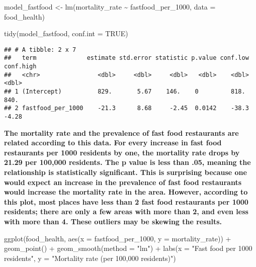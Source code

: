 \documentclass[
]{article}
\newenvironment{Shaded}{\begin{snugshade}}{\end{snugshade}}
\newcommand{\AttributeTok}[1]{\textcolor[rgb]{0.77,0.63,0.00}{#1}}
\newcommand{\ConstantTok}[1]{\textcolor[rgb]{0.00,0.00,0.00}{#1}}
\newcommand{\FunctionTok}[1]{\textcolor[rgb]{0.00,0.00,0.00}{#1}}
\newcommand{\NormalTok}[1]{#1}
\newcommand{\OtherTok}[1]{\textcolor[rgb]{0.56,0.35,0.01}{#1}}
\newcommand{\SpecialCharTok}[1]{\textcolor[rgb]{0.00,0.00,0.00}{#1}}
\newcommand{\StringTok}[1]{\textcolor[rgb]{0.31,0.60,0.02}{#1}}
\begin{document}
\begin{Shaded}
\begin{Highlighting}[]
\NormalTok{model\_fastfood }\OtherTok{\textless{}{-}} \FunctionTok{lm}\NormalTok{(mortality\_rate }\SpecialCharTok{\textasciitilde{}}\NormalTok{ fastfood\_per\_1000,}
                         \AttributeTok{data =}\NormalTok{ food\_health)}

\FunctionTok{tidy}\NormalTok{(model\_fastfood, }\AttributeTok{conf.int =} \ConstantTok{TRUE}\NormalTok{)}
\end{Highlighting}
\end{Shaded}

\begin{verbatim}
## # A tibble: 2 x 7
##   term              estimate std.error statistic p.value conf.low conf.high
##   <chr>                <dbl>     <dbl>     <dbl>   <dbl>    <dbl>     <dbl>
## 1 (Intercept)          829.       5.67    146.    0         818.     840.  
## 2 fastfood_per_1000    -21.3      8.68     -2.45  0.0142    -38.3     -4.28
\end{verbatim}

\textbf{The mortality rate and the prevalence of fast food restaurants
are related according to this data. For every increase in fast food
restaurants per 1000 residents by one, the mortality rate drops by 21.29
per 100,000 residents. The p value is less than .05, meaning the
relationship is statistically significant. This is surprising because
one would expect an increase in the prevalence of fast food restaurants
would increase the mortality rate in the area. However, according to
this plot, most places have less than 2 fast food restaurants per 1000
residents; there are only a few areas with more than 2, and even less
with more than 4. These outliers may be skewing the results. }

\begin{Shaded}
\begin{Highlighting}[]
\FunctionTok{ggplot}\NormalTok{(food\_health, }\FunctionTok{aes}\NormalTok{(}\AttributeTok{x =}\NormalTok{ fastfood\_per\_1000, }\AttributeTok{y =}\NormalTok{ mortality\_rate)) }\SpecialCharTok{+}
  \FunctionTok{geom\_point}\NormalTok{() }\SpecialCharTok{+}
  \FunctionTok{geom\_smooth}\NormalTok{(}\AttributeTok{method =} \StringTok{"lm"}\NormalTok{) }\SpecialCharTok{+}
  \FunctionTok{labs}\NormalTok{(}\AttributeTok{x =} \StringTok{"Fast food per 1000 residents"}\NormalTok{, }
       \AttributeTok{y =} \StringTok{"Mortality rate (per 100,000 residents)"}\NormalTok{)}
\end{Highlighting}
\end{Shaded}
\end{document}
